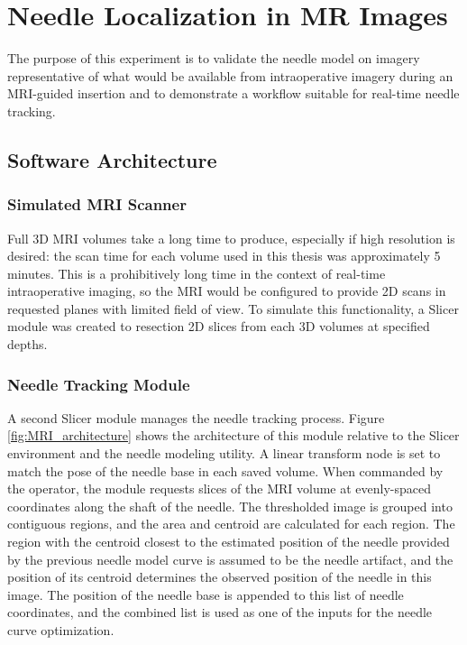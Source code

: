\chapter{Needle Localization in MR Images}
\label{sec:mritracking} %

The purpose of this experiment is to validate the needle model on imagery representative of what would be available from intraoperative imagery during an MRI-guided insertion and to demonstrate a workflow suitable for real-time needle tracking.

\section{Software Architecture}
\subsection{Simulated MRI Scanner}
Full 3D MRI volumes take a long time to produce, especially if high resolution is desired: the scan time for each volume used in this thesis was approximately 5 minutes. This is a prohibitively long time in the context of real-time intraoperative imaging, so the MRI would be configured to provide 2D scans in requested planes with limited field of view. To simulate this functionality, a  Slicer module was created to resection 2D slices from each 3D volumes at specified depths.

\subsection{Needle Tracking Module}
A second Slicer module manages the needle tracking process. Figure \ref{fig:MRI_architecture} shows the architecture of this module relative to the Slicer environment and the needle modeling utility. A linear transform node is set to match the pose of the needle base in each saved volume. When commanded by the operator, the module requests slices of the MRI volume at evenly-spaced coordinates along the shaft of the needle. The thresholded image is grouped into contiguous regions, and the area and centroid are calculated for each region. The region with the centroid closest to the estimated position of the needle provided by the previous needle model curve is assumed to be the needle artifact, and the position of its centroid determines the observed position of the needle in this image. The position of the needle base is appended to this list of needle coordinates, and the combined list is used as one of the inputs for the needle curve optimization.

